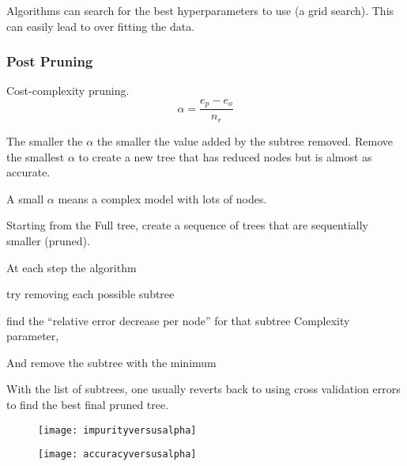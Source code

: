 Algorithms can search for the best hyperparameters to use (a grid search).  This can easily lead to over fitting the data.

	\subsubsection{Post Pruning}
Cost-complexity pruning.
	\begin{equation}
		\alpha = \frac{e_p - e_o}{n_r}
	\end{equation}
	\begin{mathwhere}[0.4in]
	\end{mathwhere}
The smaller the $\alpha$ the smaller the value added by the subtree removed.  Remove the smallest $\alpha$ to create a new tree that has reduced nodes but is almost as accurate.

A small $\alpha$ means a complex model with lots of nodes.

	\begin{bulletedlist}
		\item Starting from the Full tree, create a sequence of trees that are sequentially smaller (pruned).
		\item At each step the algorithm
		\item try removing each possible subtree
		\item find the ``relative error decrease per node'' for that subtree Complexity parameter,
		\item And remove the subtree with the minimum
		\item With the list of subtrees, one usually reverts back to using cross validation errors to find the best final pruned tree.
	\end{bulletedlist}

	\begin{figure}[tbp]
		\begin{minipage}[t]{0.475\textwidth}
			\flushleft
			\texttt{[image: impurityversusalpha]}
		\end{minipage}
		\hfill
		\begin{minipage}[t]{0.475\textwidth}
			\flushright
			\texttt{[image: accuracyversusalpha]}
		\end{minipage}
	\end{figure}


